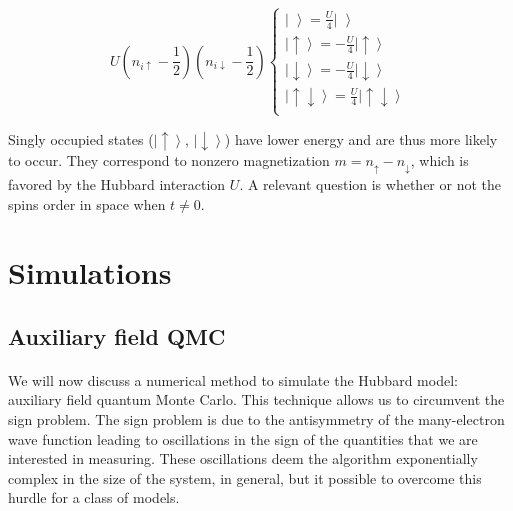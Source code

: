 \documentclass[10pt, twocolumn, twoside]{article}
\begin{document}
\begin{equation}
U (n_{i\uparrow} - \frac{1}{2} ) ( n_{i\downarrow} - \frac{1}{2} ) 
\begin{cases}
\left| \,\, \right\rangle = \frac{U}{4} \left| \,\, \right\rangle \\
\left|\uparrow \right\rangle = -\frac{U}{4} \left|\uparrow \right\rangle \\
\left|\downarrow\right \rangle = -\frac{U}{4} \left|\downarrow\right \rangle \\
\left|\uparrow \downarrow \right\rangle = \frac{U}{4} \left|\uparrow \downarrow \right\rangle \\
\end{cases}
\end{equation}

Singly occupied states ($\left|\uparrow \right\rangle$, $\left|\downarrow\right \rangle$) have lower energy and are thus more likely to occur. They correspond to nonzero magnetization $m = n_{\uparrow} - n_{\downarrow}$, which is favored by the Hubbard interaction $U$. A relevant question is whether or not the spins order in space when $t \neq 0$.

\section{Simulations}\label{hubbQMC}

\subsection{Auxiliary field QMC}\paragraph{}

We will now discuss a numerical method to simulate the Hubbard model: auxiliary field quantum Monte Carlo. This technique allows us to circumvent the sign problem. The sign problem is due to the antisymmetry of the many-electron wave function leading to oscillations in the sign of the quantities that we are interested in measuring. These oscillations deem the algorithm exponentially complex in the size of the system, in general, but it possible to overcome this hurdle for a class of models.
\end{document}

